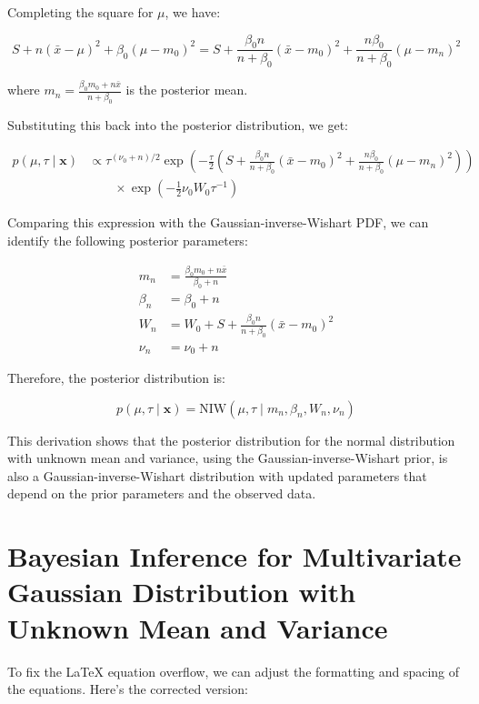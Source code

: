 \documentclass[11pt]{article}
\begin{document}
    Completing the square for $\mu$, we have:

    $$S + n (\bar{x} - \mu)^2 + \beta_0 (\mu - m_0)^2 = S + \frac{\beta_0 n}{n + \beta_0} (\bar{x} - m_0)^2 + \frac{n \beta_0}{n + \beta_0} (\mu - m_n)^2$$

    where $m_n = \frac{\beta_0 m_0 + n \bar{x}}{n + \beta_0}$ is the posterior mean.

    Substituting this back into the posterior distribution, we get:

    \begin{align*}
        p(\mu, \tau \mid \mathbf{x}) &\propto \tau^{(\nu_0 + n)/2} \exp\left(-\frac{\tau}{2} \left(S + \frac{\beta_0 n}{n + \beta_0} (\bar{x} - m_0)^2 + \frac{n \beta_0}{n + \beta_0} (\mu - m_n)^2\right)\right) \\
        &\quad\quad \times \exp\left(-\frac{1}{2} \nu_0 W_0 \tau^{-1}\right)
    \end{align*}

    Comparing this expression with the Gaussian-inverse-Wishart PDF, we can identify the following posterior parameters:

    \begin{align*}
        m_n &= \frac{\beta_0 m_0 + n \bar{x}}{\beta_0 + n} \\
        \beta_n &= \beta_0 + n \\
        W_n &= W_0 + S + \frac{\beta_0 n}{n + \beta_0} (\bar{x} - m_0)^2 \\
        \nu_n &= \nu_0 + n
    \end{align*}

    Therefore, the posterior distribution is:

    $$p(\mu, \tau \mid \mathbf{x}) = \text{NIW}(\mu, \tau \mid m_n, \beta_n, W_n, \nu_n)$$

    This derivation shows that the posterior distribution for the normal distribution with unknown mean and variance, using the Gaussian-inverse-Wishart prior, is also a Gaussian-inverse-Wishart distribution with updated parameters that depend on the prior parameters and the observed data.


    \section{Bayesian Inference for Multivariate Gaussian Distribution with Unknown Mean and Variance}

    To fix the LaTeX equation overflow, we can adjust the formatting and spacing of the equations. Here's the corrected version:
\end{document}
